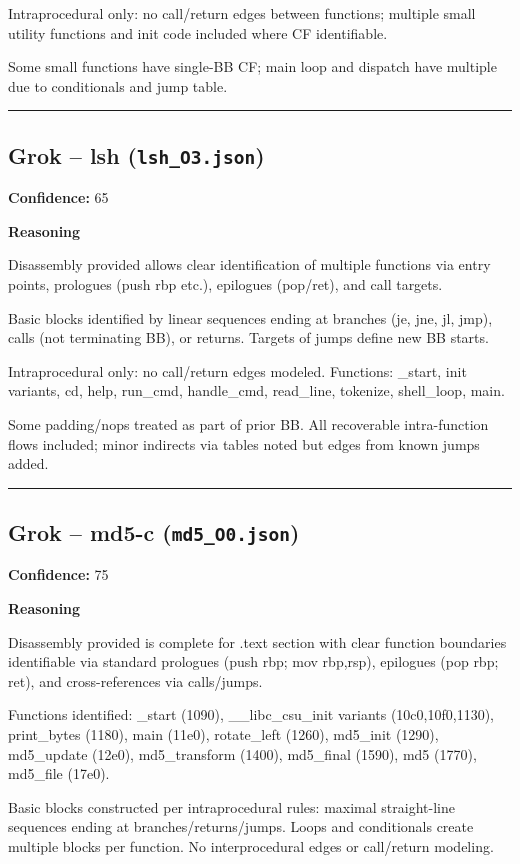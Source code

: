 Intraprocedural only: no call/return edges between functions; multiple small utility functions and init code included where CF identifiable.

Some small functions have single-BB CF; main loop and dispatch have multiple due to conditionals and jump table.

\bigskip
\hrule
\bigskip

\subsection{Grok -- lsh (\texttt{lsh\_O3.json})}

\textbf{Confidence:} 65

\textbf{Reasoning}

Disassembly provided allows clear identification of multiple functions via entry points, prologues (push rbp etc.), epilogues (pop/ret), and call targets.

Basic blocks identified by linear sequences ending at branches (je, jne, jl, jmp), calls (not terminating BB), or returns. Targets of jumps define new BB starts.

Intraprocedural only: no call/return edges modeled. Functions: \_start, init variants, cd, help, run\_cmd, handle\_cmd, read\_line, tokenize, shell\_loop, main.

Some padding/nops treated as part of prior BB. All recoverable intra-function flows included; minor indirects via tables noted but edges from known jumps added.

\bigskip
\hrule
\bigskip

\subsection{Grok -- md5-c (\texttt{md5\_O0.json})}

\textbf{Confidence:} 75

\textbf{Reasoning}

Disassembly provided is complete for .text section with clear function boundaries identifiable via standard prologues (push rbp; mov rbp,rsp), epilogues (pop rbp; ret), and cross-references via calls/jumps.

Functions identified: \_start (1090), \_\_libc\_csu\_init variants (10c0,10f0,1130), print\_bytes (1180), main (11e0), rotate\_left (1260), md5\_init (1290), md5\_update (12e0), md5\_transform (1400), md5\_final (1590), md5 (1770), md5\_file (17e0).

Basic blocks constructed per intraprocedural rules: maximal straight-line sequences ending at branches/returns/jumps. Loops and conditionals create multiple blocks per function. No interprocedural edges or call/return modeling.

